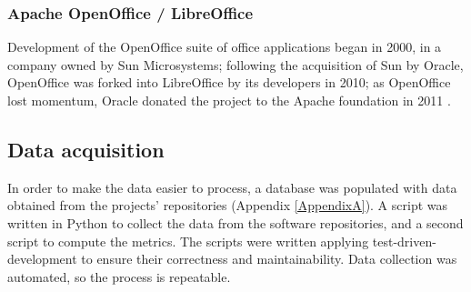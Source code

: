 \begin{description}
  
  
\end{description}

\subsubsection{Apache OpenOffice / LibreOffice}
Development of the OpenOffice suite of office applications began in 2000, in a company owned by Sun Microsystems; following the acquisition of Sun by Oracle, OpenOffice was forked into LibreOffice by its developers in 2010; as OpenOffice lost momentum, Oracle donated the project to the Apache foundation in 2011 \citep{Gamalielsson2014b}.

\begin{description}
  

\end{description}

\subsection{Data acquisition}
In order to make the data easier to process, a database was populated with data obtained from the projects' repositories (Appendix \ref{AppendixA}). A script was written in Python to collect the data from the software repositories, and a second script to compute the metrics. The scripts were written applying test-driven-development to ensure their correctness and maintainability. Data collection was automated, so the process is repeatable.

